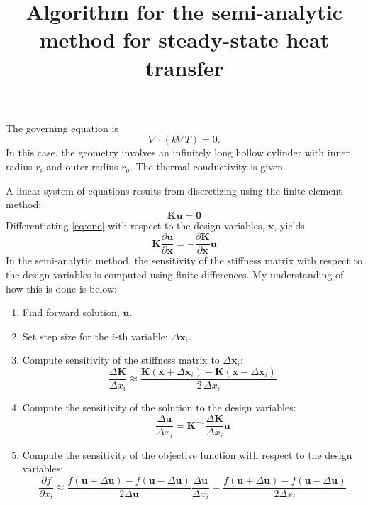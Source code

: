 \documentclass[11pt]{article}
\title{Algorithm for the semi-analytic method for steady-state heat transfer}
\begin{document}
\maketitle

The governing equation is
\[
  \nabla \cdot (k \nabla T) = 0.
\]
In this case, the geometry involves an infinitely long hollow cylinder with inner radius $r_i$ and outer radius $r_o$.  The thermal conductivity is given. 

A linear system of equations results from discretizing using the finite element method:
\begin{equation}\label{eq:one}
  \mathbf{K} \mathbf{u} = \mathbf{0}
\end{equation}
Differentiating \eqref{eq:one} with respect to the design variables, $\mathbf{x}$, yields
\begin{equation}\label{eq:one}
  \mathbf{K} \frac{\partial \mathbf{u}}{\partial \mathbf{x}} = - \frac{\partial \mathbf{K}}{\partial \mathbf{x}} \mathbf{u}
\end{equation}
In the semi-analytic method, the sensitivity of the stiffness matrix with respect to the design variables is computed using finite differences.  My understanding of how this is done is below:

\begin{enumerate}
  \item Find forward solution, $\mathbf{u}$.
  \item Set step size for the $i$-th variable: $\Delta \mathbf{x}_i$.
  \item Compute sensitivity of the stiffness matrix to $\Delta \mathbf{x}_i$:
    \[
      \frac{\Delta \mathbf{K}}{\Delta x_i} \approx \frac{\mathbf{K}(\mathbf{x} + \Delta \mathbf{x}_i) - \mathbf{K}(\mathbf{x} - \Delta \mathbf{x}_i)}{2 \, \Delta x_i}
    \]
  \item Compute the sensitivity of the solution to the design variables:
    \[
      \frac{\Delta \mathbf{u}}{\Delta x_i} = \mathbf{K}^{-1} \frac{\Delta \mathbf{K}}{\Delta x_i} \mathbf{u}
    \]
  \item Compute the sensitivity of the objective function with respect to the design variables:
    \[
      \frac{\partial f}{\partial x_i} \approx \frac{f(\mathbf{u} + \Delta \mathbf{u}) - f(\mathbf{u}-\Delta \mathbf{u})}{2 \Delta \mathbf{u}} \frac{\Delta \mathbf{u}}{\Delta x_i} = \frac{f(\mathbf{u} + \Delta \mathbf{u}) - f(\mathbf{u}-\Delta \mathbf{u})}{2\Delta x_i}
    \]
\end{enumerate}
\end{document}
